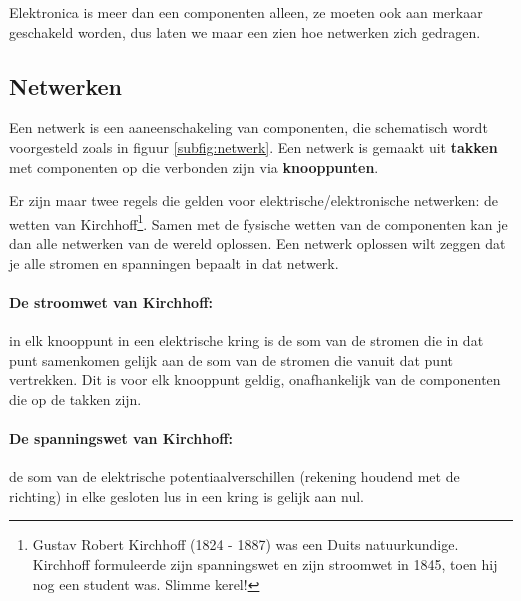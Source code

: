 \documentclass{article}
\begin{document}
		Elektronica is meer dan een componenten alleen, ze moeten ook aan merkaar geschakeld worden, dus laten we maar een zien hoe netwerken zich gedragen.

		\subsection{Netwerken}

			Een netwerk is een aaneenschakeling van componenten, die schematisch wordt voorgesteld zoals in figuur \ref{subfig:netwerk}. Een netwerk is gemaakt uit \textbf{takken}  met componenten op die verbonden zijn via \textbf{knooppunten}. 

			 Er zijn maar twee regels die gelden voor elektrische/elektronische netwerken: de wetten van Kirchhoff\footnote{Gustav Robert Kirchhoff (1824 - 1887) was een Duits natuurkundige. Kirchhoff formuleerde zijn spanningswet en zijn stroomwet in 1845, toen hij nog een student was. Slimme kerel!}. Samen met de fysische wetten van de componenten kan je dan alle netwerken van de wereld oplossen. Een netwerk oplossen wilt zeggen dat je alle stromen en spanningen bepaalt in dat netwerk.

			\paragraph*{De stroomwet van Kirchhoff:} in elk knooppunt in een elektrische kring is de som van de stromen die in dat punt samenkomen gelijk aan de som van de stromen die vanuit dat punt vertrekken. Dit is voor elk knooppunt geldig, onafhankelijk van de componenten die op de takken zijn. 
			\paragraph*{De spanningswet van Kirchhoff:} de som van de elektrische potentiaalverschillen (rekening houdend met de richting) in elke gesloten lus in een kring is gelijk aan nul. 
\end{document}
